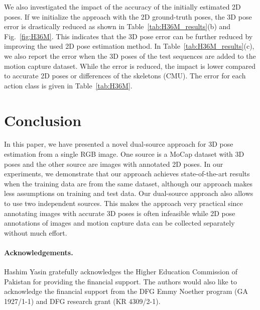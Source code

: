 \documentclass[10pt,twocolumn,letterpaper]{article}
\begin{document}
We also investigated the impact of the accuracy of the initially estimated 2D poses. If we initialize the approach with the 2D ground-truth poses, the 3D pose error is drastically reduced as shown in Table~\ref{tab:H36M_results}(b) and Fig.~\ref{fig:H36M}. This indicates that the 3D pose error can be further reduced by improving the used 2D pose estimation method. In Table~\ref{tab:H36M_results}(c), we also report the error when the 3D poses of the test sequences are added to the motion capture dataset. While the error is reduced, the impact is lower compared to accurate 2D poses or differences of the skeletons (CMU). The error for each action class is given in Table~\ref{tab:H36M}.

\section{Conclusion}\label{sec:con}
In this paper, we have presented a novel dual-source approach for 3D pose estimation from a single RGB image. One source is a MoCap dataset with 3D poses and the other source are images with annotated 2D poses. In our experiments, we demonstrate that our approach achieves state-of-the-art results when the training data are from the same dataset, although our approach makes less assumptions on training and test data. Our dual-source approach also allows to use two independent sources. This makes the approach very practical since annotating images with accurate 3D poses is often infeasible while 2D pose annotations of images and motion capture data can be collected separately without much effort. 
\paragraph{Acknowledgements.} Hashim Yasin gratefully acknowledges the Higher Education Commission of Pakistan for providing the financial support. The authors would also like to acknowledge the financial support from the DFG Emmy Noether program (GA 1927/1-1) and DFG research grant (KR 4309/2-1).

{\small


}
\end{document}
